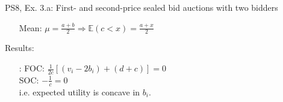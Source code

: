 \begin{frame}{PS8, Ex. 3.a: First- and second-price sealed bid auctions with two bidders}
\begin{multicols}{2}
\begin{enumerate}
        \item[Mean:] $\mu=\frac{a+b}{2}\Rightarrow\mathbb{E}(c<x)=\frac{a+x}{2}$
      \end{enumerate}
      \vspace{-6pt}
      Results:
      \vspace{-6pt}
      \begin{itemize}
        \item[\nth{2}:] FOC: $\frac{1}{2c}[(v_i-2b_i)+(d+c)]=0$\\
                        SOC: $-\frac{1}{c}=0$\\
                        i.e. expected utility is concave in $b_i$.
      \end{itemize}
      \vfill\null
    \end{multicols}
\end{frame}
